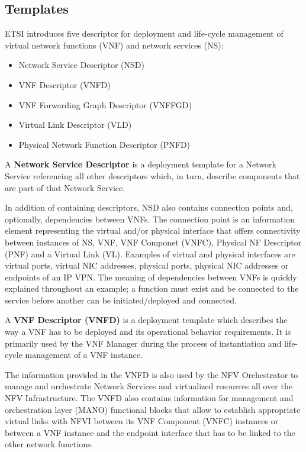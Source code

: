 \subsection{Templates}
\label{sec:NFFG}
ETSI introduces five descriptor for deployment and life-cycle management of virtual network functions (VNF) and network services (NS):
\begin{itemize}
	\item Network Service Descriptor (NSD)
	\item VNF Descriptor (VNFD)
	\item VNF Forwarding Graph Descriptor (VNFFGD)
	\item Virtual Link Descriptor (VLD) 
	\item Physical Network Function Descriptor (PNFD) 
\end{itemize}

A \textbf{Network Service Descriptor} is a deployment template for a Network Service referencing all other descriptors which, in turn, describe components that are part of that Network Service.

In addition of containing descriptors, NSD also contains connection points and, optionally, dependencies between VNFs. The connection point is an information element representing the virtual and/or physical interface that offers connectivity between instances of NS, VNF, VNF Componet (VNFC), Physical NF Descriptor (PNF) and a Virtual Link (VL). Examples of virtual and physical interfaces are virtual ports, virtual NIC addresses, physical ports, physical NIC addresses or endpoints of an IP VPN.
The meaning of dependencies between VNFs is quickly explained throughout an example; a function must exist and be connected to the service before another can be initiated/deployed and connected.

A \textbf{VNF Descriptor (VNFD)} is a deployment template which describes the way a VNF has to be deployed and its operational behavior requirements. It is primarily used by the VNF Manager during the process of instantiation and life-cycle management of a VNF instance.

The information provided in the VNFD is also used by the NFV Orchestrator to manage and orchestrate Network Services and virtualized resources all over the NFV Infrastructure. The VNFD also contains information for management and orchestration layer (MANO) functional blocks that allow to establish appropriate virtual links with NFVI between its VNF Component (VNFC) instances or between a VNF instance and the endpoint interface that has to be linked to the other network functions.

